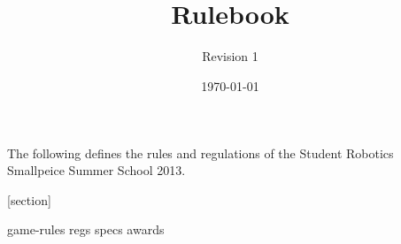 \documentclass[a4paper, 11pt]{scrartcl}
\title {\compname \\ Rulebook}
\author{Revision 1}
\date{\today}
\newcommand{\compname}{Student Robotics Smallpeice Summer School 2013}
\begin{document}
\maketitle

\noindent The following defines the rules and regulations of the \compname.

[section]
\newcommand{\rcn}{\stepcounter{rule}\arabic{section}.\arabic{rule}}
\renewcommand{\labelenumi}{\rcn}

 {game-rules}
\newpage
 {regs}
\newpage
 {specs}
\newpage
 {awards}

\renewcommand{\labelenumi}{\rcn}

\end{document}
